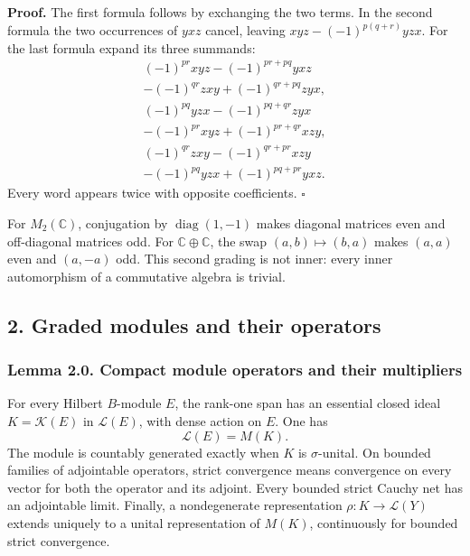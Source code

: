 \documentclass[
  11pt,
]{article}
\begin{document}
\textbf{Proof.} The first formula follows by exchanging the two terms.
In the second formula the two occurrences of \(yxz\) cancel, leaving
\(xyz-(-1)^{p(q+r)}yzx\). For the last formula expand its three
summands: \[
\begin{gathered}
(-1)^{pr}xyz-(-1)^{pr+pq}yxz\\
-(-1)^{qr}zxy+(-1)^{qr+pq}zyx,\\
(-1)^{pq}yzx-(-1)^{pq+qr}zyx\\
-(-1)^{pr}xyz+(-1)^{pr+qr}xzy,\\
(-1)^{qr}zxy-(-1)^{qr+pr}xzy\\
-(-1)^{pq}yzx+(-1)^{pq+pr}yxz.
\end{gathered}
\] Every word appears twice with opposite coefficients. \(\square\)

For \(M_2(\mathbb C)\), conjugation by \(\operatorname{diag}(1,-1)\)
makes diagonal matrices even and off-diagonal matrices odd. For
\(\mathbb C\oplus\mathbb C\), the swap \((a,b)\mapsto(b,a)\) makes
\((a,a)\) even and \((a,-a)\) odd. This second grading is not inner:
every inner automorphism of a commutative algebra is trivial.

\subsection{2. Graded modules and their
operators}\label{graded-modules-and-their-operators}

\subsubsection{Lemma 2.0. Compact module operators and their
multipliers}\label{lemma-2.0.-compact-module-operators-and-their-multipliers}

For every Hilbert \(B\)-module \(E\), the rank-one span has an essential
closed ideal \(K=\mathcal K(E)\) in \(\mathcal L(E)\), with dense action
on \(E\). One has \[
\mathcal L(E)=M(K).
\] The module is countably generated exactly when \(K\) is
\(\sigma\)-unital. On bounded families of adjointable operators, strict
convergence means convergence on every vector for both the operator and
its adjoint. Every bounded strict Cauchy net has an adjointable limit.
Finally, a nondegenerate representation \(\rho:K\to\mathcal L(Y)\)
extends uniquely to a unital representation of \(M(K)\), continuously
for bounded strict convergence.
\end{document}
